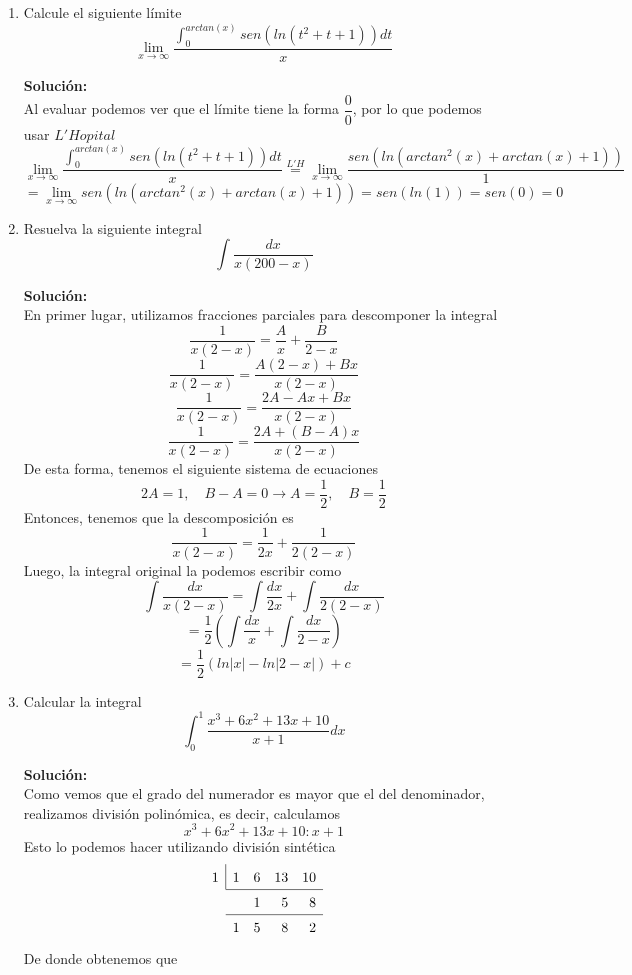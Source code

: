 \documentclass[12pt]{article}
\newenvironment{solucion}
{\begin{mdframed}[backgroundcolor=black!10]
		{\bf Solución:}\\
	}
	{
	\end{mdframed}
}
\newenvironment{preguntas}
{\begin{enumerate}\itemsep12pt
	}
	{
	\end{enumerate}
}
\newcommand{\ra}{\rightarrow}
\begin{document}
\begin{preguntas}
\item Calcule el siguiente límite
	$$\lim\limits_{x \ra \infty} \dfrac{\displaystyle\int_0^{arctan(x)} sen(ln(t^2+t+1)) dt}{x}$$
\begin{solucion}
Al evaluar podemos ver que el límite tiene la forma $\dfrac{0}{0}$, por lo que podemos usar $L'Hopital$
		$$\lim\limits_{x \ra \infty} \dfrac{\displaystyle\int_0^{arctan(x)} sen(ln(t^2+t+1)) dt}{x}
		\stackrel{L'H}{=} \lim\limits_{x \ra \infty} \dfrac{sen(ln(arctan^2(x)+arctan(x)+1))}{1}$$
		$$= \lim\limits_{x \ra \infty} sen(ln(arctan^2(x)+arctan(x)+1)) = sen(ln(1)) = sen(0) = 0$$
\end{solucion}
\item Resuelva la siguiente integral
	$$\displaystyle\int \dfrac{dx}{x(200-x)}$$
\begin{solucion}
En primer lugar, utilizamos fracciones parciales para descomponer la integral
		$$\dfrac{1}{x(2-x)} = \dfrac{A}{x} + \dfrac{B}{2-x}$$
		$$\dfrac{1}{x(2-x)} = \dfrac{A(2-x) + Bx}{x(2-x)}$$
		$$\dfrac{1}{x(2-x)} = \dfrac{2A-Ax + Bx}{x(2-x)}$$
		$$\dfrac{1}{x(2-x)} = \dfrac{2A+ (B-A)x}{x(2-x)}$$
		De esta forma, tenemos el siguiente sistema de ecuaciones
		$$2A = 1, \quad B-A = 0 \ra A = \dfrac{1}{2}, \quad B = \dfrac{1}{2}$$
		Entonces, tenemos que la descomposición es
		$$\dfrac{1}{x(2-x)} = \dfrac{1}{2x} + \dfrac{1}{2(2-x)}$$
		Luego, la integral original la podemos escribir como
		$$\displaystyle\int \dfrac{dx}{x(2-x)} = \displaystyle\int \dfrac{dx}{2x} + \displaystyle\int \dfrac{dx}{2(2-x)}$$
		$$ = \dfrac{1}{2} \left( \displaystyle\int \dfrac{dx}{x} + \displaystyle\int \dfrac{dx}{2-x} \right)$$
		$$ = \dfrac{1}{2} (ln|x| - ln|2-x| ) + c$$
\end{solucion}
\item Calcular la integral
	$$\displaystyle\int_0^1 \dfrac{x^3+6x^2+13x+10}{x+1}dx$$
\begin{solucion}
Como vemos que el grado del numerador es mayor que el del denominador, realizamos división polinómica, es decir, calculamos
		$$x^3+6x^2+13x+10 : x+1$$
		Esto lo podemos hacer utilizando división sintética
		$$
		\renewcommand\arraystretch{1.5}
		\setlength\doublerulesep{0pt}
		\begin{array}{rrrrr}
		\multicolumn{1}{r|}{1} & 1 & 6 & 13 & 10\\\cline{2-5}
		& & 1& 5 & 8 \\\cline{2-5}
		& 1 & 5& 8 & 2 
		\end{array}
		$$
		De donde obtenemos que

\end{solucion}
\end{preguntas}
\end{document}
